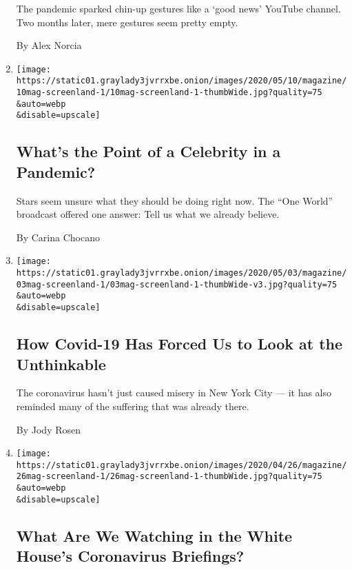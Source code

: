 \begin{enumerate}
  The pandemic sparked chin-up gestures like a `good news' YouTube
  channel. Two months later, mere gestures seem pretty empty.

  By Alex Norcia
\item
  \href{/2020/05/06/magazine/whats-the-point-of-a-celebrity-in-a-pandemic.html}{}

  \texttt{[image: https://static01.graylady3jvrrxbe.onion/images/2020/05/10/magazine/10mag-screenland-1/10mag-screenland-1-thumbWide.jpg?quality=75\\\&auto=webp\\\&disable=upscale]}

  \hypertarget{whats-the-point-of-a-celebrity-in-a-pandemic}{%
  \subsection{What's the Point of a Celebrity in a
  Pandemic?}\label{whats-the-point-of-a-celebrity-in-a-pandemic}}

  Stars seem unsure what they should be doing right now. The ``One
  World'' broadcast offered one answer: Tell us what we already believe.

  By Carina Chocano
\item
  \href{/2020/04/29/magazine/covid-hart-island.html}{}

  \texttt{[image: https://static01.graylady3jvrrxbe.onion/images/2020/05/03/magazine/03mag-screenland-1/03mag-screenland-1-thumbWide-v3.jpg?quality=75\\\&auto=webp\\\&disable=upscale]}

  \hypertarget{how-covid-19-has-forced-us-to-look-at-the-unthinkable}{%
  \subsection{How Covid-19 Has Forced Us to Look at the
  Unthinkable}\label{how-covid-19-has-forced-us-to-look-at-the-unthinkable}}

  The coronavirus hasn't just caused misery in New York City --- it has
  also reminded many of the suffering that was already there.

  By Jody Rosen
\item
  \href{/2020/04/21/magazine/coronavirus-daily-briefings.html}{}

  \texttt{[image: https://static01.graylady3jvrrxbe.onion/images/2020/04/26/magazine/26mag-screenland-1/26mag-screenland-1-thumbWide.jpg?quality=75\\\&auto=webp\\\&disable=upscale]}

  \hypertarget{what-are-we-watching-in-the-white-houses-coronavirus-briefings}{%
  \subsection{What Are We Watching in the White House's Coronavirus
  Briefings?}\label{what-are-we-watching-in-the-white-houses-coronavirus-briefings}}


\end{enumerate}
